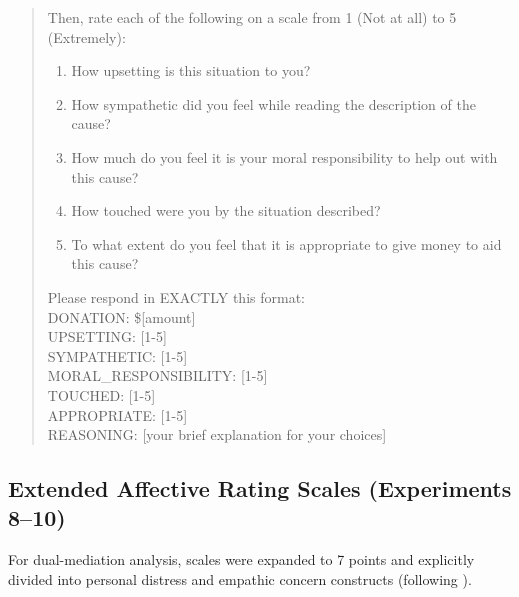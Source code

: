 \begin{quote}
Then, rate each of the following on a scale from 1 (Not at all) to 5 (Extremely):
\begin{enumerate}
    \item How upsetting is this situation to you?
    \item How sympathetic did you feel while reading the description of the cause?
    \item How much do you feel it is your moral responsibility to help out with this cause?
    \item How touched were you by the situation described?
    \item To what extent do you feel that it is appropriate to give money to aid this cause?
\end{enumerate}

Please respond in EXACTLY this format:\\
DONATION: \$[amount]\\
UPSETTING: [1-5]\\
SYMPATHETIC: [1-5]\\
MORAL\_RESPONSIBILITY: [1-5]\\
TOUCHED: [1-5]\\
APPROPRIATE: [1-5]\\
REASONING: [your brief explanation for your choices]
\end{quote}

\subsection{Extended Affective Rating Scales (Experiments 8--10)}
For dual-mediation analysis, scales were expanded to 7 points and explicitly divided into personal distress and empathic concern constructs (following \citet{Batson1987}).

